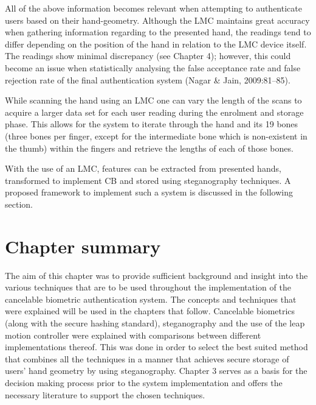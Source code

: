 All of the above information becomes relevant when attempting to authenticate users based on their hand-geometry. Although the LMC maintains great accuracy when gathering information regarding to the presented hand, the readings tend to differ depending on the position of the hand in relation to the LMC device itself. The readings show minimal discrepancy (see Chapter 4); however, this could become an issue when statistically analysing the false acceptance rate and false rejection rate of the final authentication system (Nagar \& Jain, 2009:81–85).

While scanning the hand using an LMC one can vary the length of the scans to acquire a larger data set for each user reading during the enrolment and storage phase. This allows for the system to iterate through the hand and its 19 bones (three bones per finger, except for the intermediate bone which is non-existent in the thumb) within the fingers and retrieve the lengths of each of those bones.

With the use of an LMC, features can be extracted from presented hands, transformed to implement CB and stored using steganography techniques. A proposed framework to implement such a system is discussed in the following section.


\section[Chapter summary]{Chapter summary}

The aim of this chapter was to provide sufficient background and insight into the various techniques that are to be used throughout the implementation of the cancelable biometric authentication system. The concepts and techniques that were explained will be used in the chapters that follow. Cancelable biometrics (along with the secure hashing standard), steganography and the use of the leap motion controller were explained with comparisons between different implementations thereof. This was done in order to select the best suited method that combines all the techniques in a manner that achieves secure storage of users’ hand geometry by using steganography.
Chapter 3 serves as a basis for the decision making process prior to the system implementation and offers the necessary literature to support the chosen techniques.


